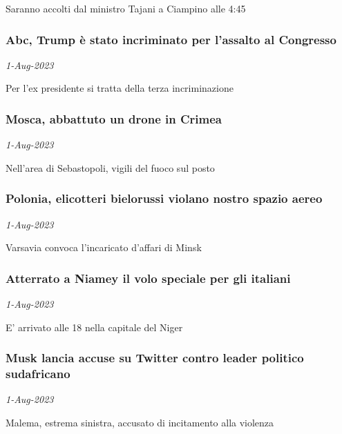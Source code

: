 Saranno accolti dal ministro Tajani a Ciampino alle 4:45
\subsubsection{Abc, Trump \`{e} stato incriminato per l'assalto al Congresso \href{https://www.ansa.it/sito/notizie/mondo/nordamerica/2023/08/01/abc-trump-e-stato-incriminato-per-lassalto-al-congresso_8a503421-cc67-4fcb-8b80-6e8f80abeca5.html}{}}
\textit{1-Aug-2023}

Per l'ex presidente si tratta della terza incriminazione
\subsubsection{Mosca, abbattuto un drone in Crimea \href{https://www.ansa.it/sito/notizie/mondo/europa/2023/08/01/mosca-abbattuto-un-drone-in-crimea_4d6d30eb-bfb2-4d77-9516-3c244fe558ba.html}{}}
\textit{1-Aug-2023}

Nell'area di Sebastopoli, vigili del fuoco sul posto
\subsubsection{Polonia, elicotteri bielorussi violano nostro spazio aereo \href{https://www.ansa.it/sito/notizie/mondo/africa/2023/08/01/polonia-elicotteri-bielorussi-violano-nostro-spazio-aereo_9b5fd825-c81f-44ef-90e8-79b73a7922fb.html}{}}
\textit{1-Aug-2023}

Varsavia convoca l'incaricato d'affari di Minsk
\subsubsection{Atterrato a Niamey il volo speciale per gli italiani \href{https://www.ansa.it/sito/notizie/mondo/africa/2023/08/01/atterrato-a-niamey-il-volo-speciale-per-gli-italiani_c930c1d6-19c0-4544-b8d3-257cd773abf1.html}{}}
\textit{1-Aug-2023}

E' arrivato alle 18 nella capitale del Niger
\subsubsection{Musk lancia accuse su Twitter contro leader politico sudafricano \href{https://www.ansa.it/sito/notizie/mondo/africa/2023/08/01/musk-lancia-accuse-su-twitter-contro-leader-politico-sudafricano_f969c01f-6dfd-4a0d-8364-09989f08b2d9.html}{}}
\textit{1-Aug-2023}

Malema, estrema sinistra, accusato di incitamento alla violenza
